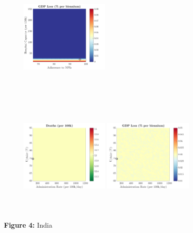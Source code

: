 \documentclass[paper=a4, fontsize=11pt]{scrartcl}
\numberwithin{figure}{section}
\numberwithin{table}{section}
\begin{document}
\begin{figure}[H]
\begin{subfigure}[b]{\textwidth}
	\hspace{0.05cm}
    	\includegraphics[width=0.49\textwidth,height=6cm]{IN/SWINE/npl_g}
    \end{subfigure}
    \begin{subfigure}[b]{\textwidth}
      	\includegraphics[width=0.49\textwidth,height=6cm]{IN/SWINE/imm_d}
	\hspace{0.05cm}
    	\includegraphics[width=0.49\textwidth,height=6cm]{IN/SWINE/imm_g}
    \end{subfigure}
\caption*{\textbf{Figure 4:} India} 
\end{figure}
\end{document}
